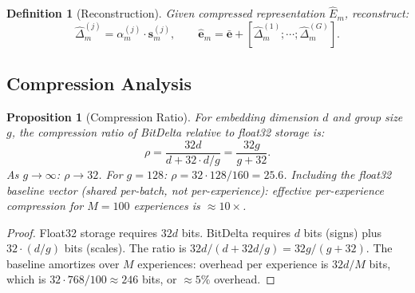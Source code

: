 \documentclass[11pt]{article}
\newtheorem{proposition}[theorem]{Proposition}
\newtheorem{definition}{Definition}
\begin{document}
\begin{definition}[Reconstruction]
Given compressed representation $\widehat{E}_m$, reconstruct:
\begin{equation}
    \hat{\Delta}_m^{(j)} = \alpha_m^{(j)} \cdot \bm{s}_m^{(j)},
    \qquad
    \hat{\bm{e}}_m = \bar{\bm{e}} + \left[\hat{\Delta}_m^{(1)}; \cdots; \hat{\Delta}_m^{(G)}\right].
    \label{eq:reconstruct}
\end{equation}
\end{definition}

\subsection{Compression Analysis}

\begin{proposition}[Compression Ratio]
\label{prop:compression}
For embedding dimension $d$ and group size $g$, the compression ratio of
BitDelta relative to float32 storage is:
\begin{equation}
    \rho = \frac{32d}{d + 32 \cdot d/g} = \frac{32g}{g + 32}.
    \label{eq:compression-ratio}
\end{equation}
As $g \to \infty$: $\rho \to 32$. For $g = 128$: $\rho = 32 \cdot 128 / 160 = 25.6$.
Including the float32 baseline vector (shared per-batch, not per-experience):
effective per-experience compression for $M = 100$ experiences is ${\approx}10\times$.
\end{proposition}

\begin{proof}
Float32 storage requires $32d$ bits. BitDelta requires $d$ bits (signs) plus
$32 \cdot (d/g)$ bits (scales). The ratio is $32d / (d + 32d/g) = 32g/(g+32)$.
The baseline amortizes over $M$ experiences: overhead per experience is $32d / M$
bits, which is $32 \cdot 768 / 100 \approx 246$ bits, or ${\approx}5\%$ overhead.
\end{proof}
\end{document}
